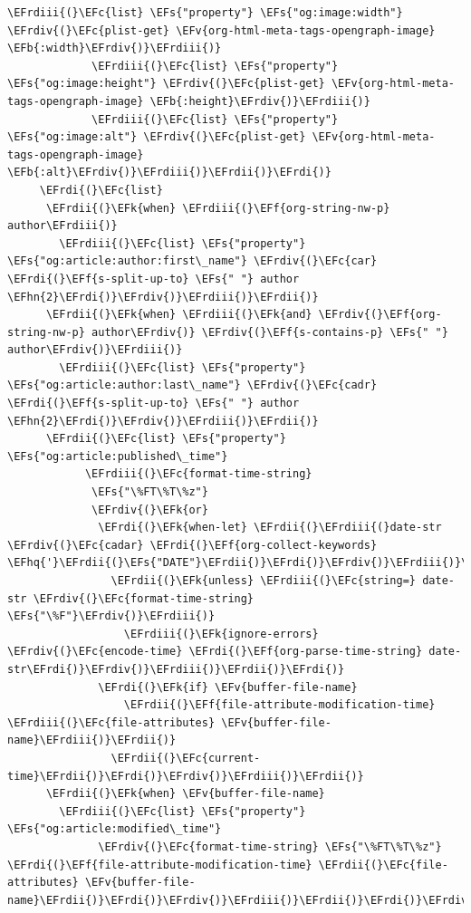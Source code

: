 \documentclass{scrartcl}
\newcommand{\EFk}[1]{\textcolor{EFk}{#1}} %
\newcommand{\EFs}[1]{\textcolor{EFs}{#1}} %
\newcommand{\EFb}[1]{\textcolor{EFb}{#1}} %
\newcommand{\EFc}[1]{\textcolor{EFc}{#1}} %
\newcommand{\EFv}[1]{\textcolor{EFv}{#1}} %
\newcommand{\EFf}[1]{\textcolor{EFf}{#1}} %
\newcommand{\EFhn}[1]{#1} %
\newcommand{\EFhq}[1]{#1} %
\newcommand{\EFrdi}[1]{#1} %
\newcommand{\EFrdii}[1]{#1} %
\newcommand{\EFrdiii}[1]{#1} %
\newcommand{\EFrdiv}[1]{#1} %
\begin{document}
\begin{Code}
\begin{Verbatim}[]
             \EFrdiii{(}\EFc{list} \EFs{"property"} \EFs{"og:image:width"} \EFrdiv{(}\EFc{plist-get} \EFv{org-html-meta-tags-opengraph-image} \EFb{:width}\EFrdiv{)}\EFrdiii{)}
             \EFrdiii{(}\EFc{list} \EFs{"property"} \EFs{"og:image:height"} \EFrdiv{(}\EFc{plist-get} \EFv{org-html-meta-tags-opengraph-image} \EFb{:height}\EFrdiv{)}\EFrdiii{)}
             \EFrdiii{(}\EFc{list} \EFs{"property"} \EFs{"og:image:alt"} \EFrdiv{(}\EFc{plist-get} \EFv{org-html-meta-tags-opengraph-image} \EFb{:alt}\EFrdiv{)}\EFrdiii{)}\EFrdii{)}\EFrdi{)}
     \EFrdi{(}\EFc{list}
      \EFrdii{(}\EFk{when} \EFrdiii{(}\EFf{org-string-nw-p} author\EFrdiii{)}
        \EFrdiii{(}\EFc{list} \EFs{"property"} \EFs{"og:article:author:first\_name"} \EFrdiv{(}\EFc{car} \EFrdi{(}\EFf{s-split-up-to} \EFs{" "} author \EFhn{2}\EFrdi{)}\EFrdiv{)}\EFrdiii{)}\EFrdii{)}
      \EFrdii{(}\EFk{when} \EFrdiii{(}\EFk{and} \EFrdiv{(}\EFf{org-string-nw-p} author\EFrdiv{)} \EFrdiv{(}\EFf{s-contains-p} \EFs{" "} author\EFrdiv{)}\EFrdiii{)}
        \EFrdiii{(}\EFc{list} \EFs{"property"} \EFs{"og:article:author:last\_name"} \EFrdiv{(}\EFc{cadr} \EFrdi{(}\EFf{s-split-up-to} \EFs{" "} author \EFhn{2}\EFrdi{)}\EFrdiv{)}\EFrdiii{)}\EFrdii{)}
      \EFrdii{(}\EFc{list} \EFs{"property"} \EFs{"og:article:published\_time"}
            \EFrdiii{(}\EFc{format-time-string}
             \EFs{"\%FT\%T\%z"}
             \EFrdiv{(}\EFk{or}
              \EFrdi{(}\EFk{when-let} \EFrdii{(}\EFrdiii{(}date-str \EFrdiv{(}\EFc{cadar} \EFrdi{(}\EFf{org-collect-keywords} \EFhq{'}\EFrdii{(}\EFs{"DATE"}\EFrdii{)}\EFrdi{)}\EFrdiv{)}\EFrdiii{)}\EFrdii{)}
                \EFrdii{(}\EFk{unless} \EFrdiii{(}\EFc{string=} date-str \EFrdiv{(}\EFc{format-time-string} \EFs{"\%F"}\EFrdiv{)}\EFrdiii{)}
                  \EFrdiii{(}\EFk{ignore-errors} \EFrdiv{(}\EFc{encode-time} \EFrdi{(}\EFf{org-parse-time-string} date-str\EFrdi{)}\EFrdiv{)}\EFrdiii{)}\EFrdii{)}\EFrdi{)}
              \EFrdi{(}\EFk{if} \EFv{buffer-file-name}
                  \EFrdii{(}\EFf{file-attribute-modification-time} \EFrdiii{(}\EFc{file-attributes} \EFv{buffer-file-name}\EFrdiii{)}\EFrdii{)}
                \EFrdii{(}\EFc{current-time}\EFrdii{)}\EFrdi{)}\EFrdiv{)}\EFrdiii{)}\EFrdii{)}
      \EFrdii{(}\EFk{when} \EFv{buffer-file-name}
        \EFrdiii{(}\EFc{list} \EFs{"property"} \EFs{"og:article:modified\_time"}
              \EFrdiv{(}\EFc{format-time-string} \EFs{"\%FT\%T\%z"} \EFrdi{(}\EFf{file-attribute-modification-time} \EFrdii{(}\EFc{file-attributes} \EFv{buffer-file-name}\EFrdii{)}\EFrdi{)}\EFrdiv{)}\EFrdiii{)}\EFrdii{)}\EFrdi{)}\EFrdiv{)}\EFrdiii{)}\EFrdii{)}


\end{Verbatim}
\end{Code}
\end{document}
